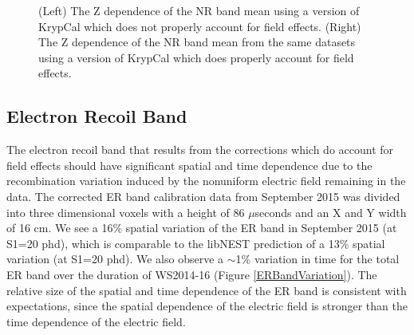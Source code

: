 \documentclass[a4paper,10pt,twocolumn]{article}
\begin{document}
\begin{figure}
\centering
{}
\qquad
{}
\caption{ (Left) The Z dependence of the NR band mean using a version of KrypCal which does not properly account for field effects. (Right) The Z dependence of the NR band mean from the same datasets using a version of KrypCal which does properly account for field effects.  }
\label{NRBandZ}
\end{figure}

\subsection{Electron Recoil Band}

The electron recoil band that results from the corrections which do account for field effects should have significant spatial and time dependence due to the recombination variation induced by the nonuniform electric field remaining in the data. The corrected ER band calibration data from September 2015 was divided into three dimensional voxels with a height of 86 $\mu$seconds and an X and Y width of 16 cm.  We see a 16\% spatial variation of the ER band in September 2015 (at S1=20 phd), which is comparable to the libNEST prediction of a 13\% spatial variation (at S1=20 phd).  We also observe a $\sim$1\% variation in time for the total ER band over the duration of WS2014-16 (Figure \ref{ERBandVariation}). The relative size of the spatial and time dependence of the ER band is consistent with expectations, since the spatial dependence of the electric field is stronger than the time dependence of the electric field. 
\end{document}

